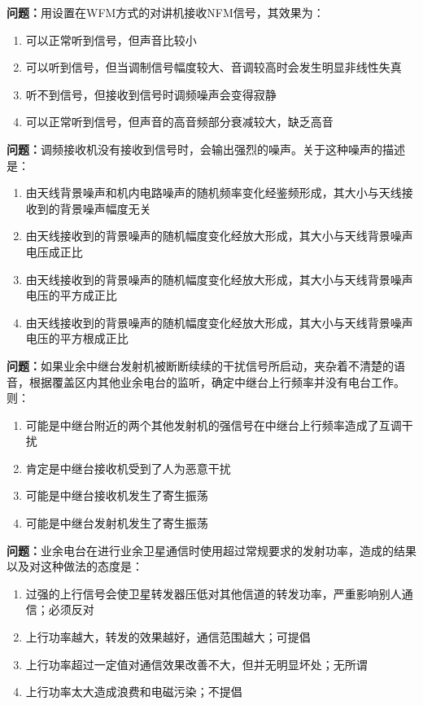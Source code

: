 \bigskip


\noindent\textbf{问题：}用设置在WFM方式的对讲机接收NFM信号，其效果为：
\begin{enumerate}[label=\Alph*), leftmargin=3em]
\item 可以正常听到信号，但声音比较小
\item 可以听到信号，但当调制信号幅度较大、音调较高时会发生明显非线性失真
\item 听不到信号，但接收到信号时调频噪声会变得寂静
\item 可以正常听到信号，但声音的高音频部分衰减较大，缺乏高音
\end{enumerate}

\bigskip


\noindent\textbf{问题：}调频接收机没有接收到信号时，会输出强烈的噪声。关于这种噪声的描述是：
\begin{enumerate}[label=\Alph*), leftmargin=3em]
\item 由天线背景噪声和机内电路噪声的随机频率变化经鉴频形成，其大小与天线接收到的背景噪声幅度无关
\item 由天线接收到的背景噪声的随机幅度变化经放大形成，其大小与天线背景噪声电压成正比
\item 由天线接收到的背景噪声的随机幅度变化经放大形成，其大小与天线背景噪声电压的平方成正比
\item 由天线接收到的背景噪声的随机幅度变化经放大形成，其大小与天线背景噪声电压的平方根成正比
\end{enumerate}

\bigskip


\noindent\textbf{问题：}如果业余中继台发射机被断断续续的干扰信号所启动，夹杂着不清楚的语音，根据覆盖区内其他业余电台的监听，确定中继台上行频率并没有电台工作。则：
\begin{enumerate}[label=\Alph*), leftmargin=3em]
\item 可能是中继台附近的两个其他发射机的强信号在中继台上行频率造成了互调干扰
\item 肯定是中继台接收机受到了人为恶意干扰
\item 可能是中继台接收机发生了寄生振荡
\item 可能是中继台发射机发生了寄生振荡
\end{enumerate}

\bigskip


\noindent\textbf{问题：}业余电台在进行业余卫星通信时使用超过常规要求的发射功率，造成的结果以及对这种做法的态度是：
\begin{enumerate}[label=\Alph*), leftmargin=3em]
\item 过强的上行信号会使卫星转发器压低对其他信道的转发功率，严重影响别人通信；必须反对
\item 上行功率越大，转发的效果越好，通信范围越大；可提倡
\item 上行功率超过一定值对通信效果改善不大，但并无明显坏处；无所谓
\item 上行功率太大造成浪费和电磁污染；不提倡
\end{enumerate}

